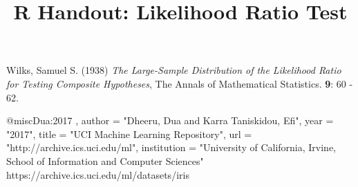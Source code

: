 \documentclass[12pt]{article}
\begin{document}
\thispagestyle{empty}
\vspace{-1in}
\title{R Handout: Likelihood Ratio Test}
\date{\vspace{-0.3in}}
\maketitle
\renewcommand\baselinestretch{1.33}

%


\normalsize


%


%

\begin{thebibliography}{9}
	
	Wilks, Samuel S. (1938)
	\textit{The Large-Sample Distribution of the Likelihood Ratio for Testing Composite Hypotheses},
	The Annals of Mathematical Statistics. \textbf{9}: 60 - 62.
	
	@misc{Dua:2017 ,
		author = "Dheeru, Dua and Karra Taniskidou, Efi",
		year = "2017",
		title = "{UCI} Machine Learning Repository",
		url = "http://archive.ics.uci.edu/ml",
		institution = "University of California, Irvine, School of Information and Computer Sciences" }
	https://archive.ics.uci.edu/ml/datasets/iris
	
	
\end{thebibliography}
\end{document}
